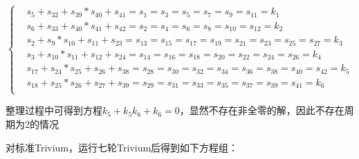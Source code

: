 \begin{equation}
\left\{
\begin{aligned}
&s_{5}+s_{32}+s_{39}*s_{40}+s_{41}=s_{1}=s_{3}=s_{5}=s_{7}=s_{9}=s_{11}=k_{1}\\
&s_{6}+s_{33}+s_{40}*s_{41}+s_{42}=s_{2}=s_{4}=s_{6}=s_{8}=s_{10}=s_{12}=k_{2}\\
&s_{2}+s_{9}*s_{10}+s_{11}+s_{23}=s_{13}=s_{15}=s_{17}=s_{19}=s_{21}=s_{23}=s_{25}=s_{27}=k_{3}\\
&s_{3}+s_{10}*s_{11}+s_{12}+s_{24}=s_{14}=s_{16}=s_{18}=s_{20}=s_{22}=s_{24}=s_{26}=k_{4}\\
&s_{17}+s_{24}*s_{25}+s_{26}+s_{38}=s_{28}=s_{30}=s_{32}=s_{34}=s_{36}=s_{38}=s_{40}=s_{42}=k_{5}\\
&s_{18}+s_{25}*s_{26}+s_{27}+s_{39}=s_{29}=s_{31}=s_{33}=s_{35}=s_{37}=s_{39}=s_{41}=k_{6}\\
\end{aligned}
\right.
\end{equation}

整理过程中可得到方程$k_{5}+k_{5}k_{6}+k_{6}=0$，显然不存在非全零的解，因此不存在周期为2的情况

\vspace{3ex}

对标准Trivium，运行七轮Trivium后得到如下方程组：

